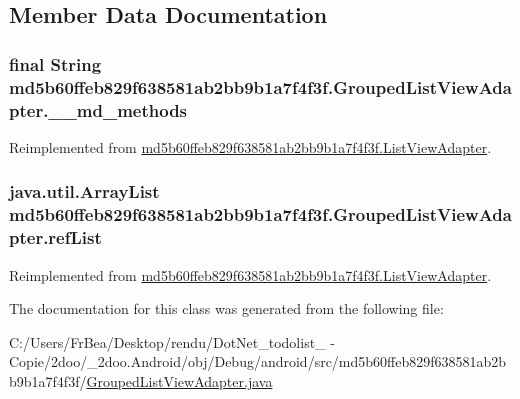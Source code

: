 \subsection{Member Data Documentation}
\hypertarget{classmd5b60ffeb829f638581ab2bb9b1a7f4f3f_1_1_grouped_list_view_adapter_e887eb8c51f6679bbffdba979210ff48}{
\subsubsection[{\_\-\_\-md\_\-methods}]{\setlength{\rightskip}{0pt plus 5cm}final String {\bf md5b60ffeb829f638581ab2bb9b1a7f4f3f.GroupedListViewAdapter.\_\-\_\-md\_\-methods}}}
\label{classmd5b60ffeb829f638581ab2bb9b1a7f4f3f_1_1_grouped_list_view_adapter_e887eb8c51f6679bbffdba979210ff48}




Reimplemented from \hyperlink{classmd5b60ffeb829f638581ab2bb9b1a7f4f3f_1_1_list_view_adapter_3484b09d18c193e3a6efbf9abd22592a}{md5b60ffeb829f638581ab2bb9b1a7f4f3f.ListViewAdapter}.\hypertarget{classmd5b60ffeb829f638581ab2bb9b1a7f4f3f_1_1_grouped_list_view_adapter_aa8849c73c487cac5b8a78f850930321}{
\subsubsection[{refList}]{\setlength{\rightskip}{0pt plus 5cm}java.util.ArrayList {\bf md5b60ffeb829f638581ab2bb9b1a7f4f3f.GroupedListViewAdapter.refList}}}
\label{classmd5b60ffeb829f638581ab2bb9b1a7f4f3f_1_1_grouped_list_view_adapter_aa8849c73c487cac5b8a78f850930321}




Reimplemented from \hyperlink{classmd5b60ffeb829f638581ab2bb9b1a7f4f3f_1_1_list_view_adapter_2b206b389692997413bd835dceb3d7ec}{md5b60ffeb829f638581ab2bb9b1a7f4f3f.ListViewAdapter}.

The documentation for this class was generated from the following file:\begin{CompactItemize}
\item 
C:/Users/FrBea/Desktop/rendu/DotNet\_\-todolist\_ - Copie/2doo/\_\-2doo.Android/obj/Debug/android/src/md5b60ffeb829f638581ab2bb9b1a7f4f3f/\hyperlink{_grouped_list_view_adapter_8java}{GroupedListViewAdapter.java}\end{CompactItemize}
